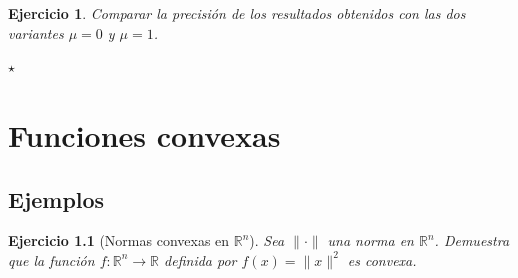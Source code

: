 \documentclass[11pt]{report}
\newtheorem{ex}{Ejercicio}
\newenvironment{solucion}{\color{blue}\textbf{Solución:}}{}
\begin{document}
\begin{ex}
Comparar la precisión de los resultados obtenidos con las dos variantes $\mu=0$ y $\mu=1$.
\end{ex}




\begin{center}
    $\star$
\end{center}

\chapter{Funciones convexas}

\section{Ejemplos}




\begin{ex}[Normas convexas en $\mathbb{R}^n$]
    Sea $\|\cdot\|$ una norma en $\mathbb{R}^n$. Demuestra que la función $f: \mathbb{R}^n \to \mathbb{R}$ definida por $f(x) = \|x\|^2$ es convexa.
\end{ex}

\end{document}
